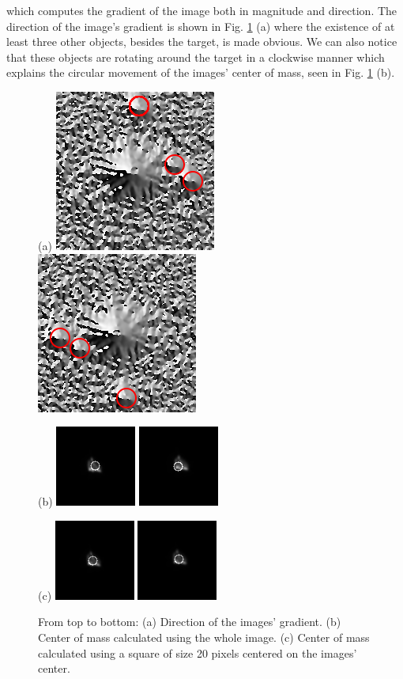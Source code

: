 \documentclass{aa}
\begin{document}
which computes the gradient of the image both in magnitude and direction. The direction of the image's gradient is shown in Fig. \ref{fig:gradient_cm} (a) where the existence of at least three other objects, besides the target, is made obvious. We can also notice that these objects are rotating around the target in a clockwise manner which explains the circular movement of the images' center of mass, seen in Fig. \ref{fig:gradient_cm} (b).

\begin{figure}
\centering

(a) \includegraphics[width=.2\textwidth]{gradient_angle_img_0.png}
\includegraphics[width=.2\textwidth]{gradient_angle_img_45.png}

(b) \includegraphics[width=.2\textwidth]{cm_r_100_img_0.png}
\includegraphics[width=.2\textwidth]{cm_r_100_img_45.png}

(c) \includegraphics[width=.2\textwidth]{cm_r_20_img_0.png}
\includegraphics[width=.2\textwidth]{cm_r_20_img_45.png}
\caption{From top to bottom: (a) Direction of the images' gradient.
							  (b) Center of mass calculated using the whole image.
							  (c) Center of mass calculated using a square of size 20 pixels 									 centered on the images' center.}
\label{fig:gradient_cm}
\end{figure}
\end{document}
